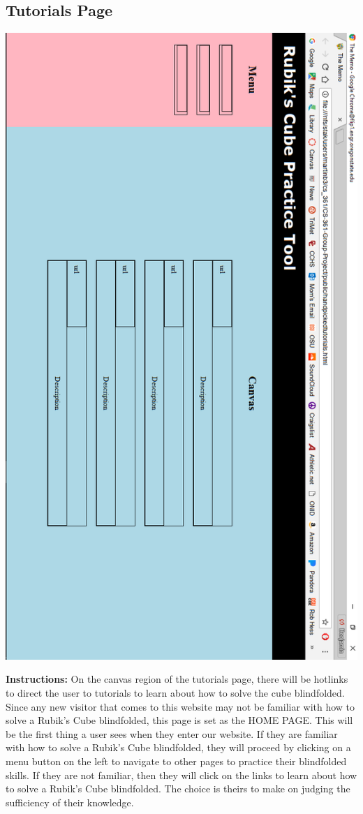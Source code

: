 \documentclass[12pt]{article}
\begin{document}
	\subsection{Tutorials Page}
	\begin{center}
	\includegraphics[width = .7\textwidth]{tutorial.PNG}
	\end{center}
	\par
	\textbf{Instructions:} On the canvas region of the tutorials page, there will be hotlinks to direct the user to tutorials to learn about how to solve the cube blindfolded. Since any new visitor that comes to this website may not be familiar with how to solve a Rubik's Cube blindfolded, this page is set as the HOME PAGE. This will be the first thing a user sees when they enter our website. If they are familiar with how to solve a Rubik's Cube blindfolded, they will proceed by clicking on a menu button on the left to navigate to other pages to practice their blindfolded skills. If they are not familiar, then they will click on the links to learn about how to solve a Rubik's Cube blindfolded. The choice is theirs to make on judging the sufficiency of their knowledge. \\
	
\end{document}
